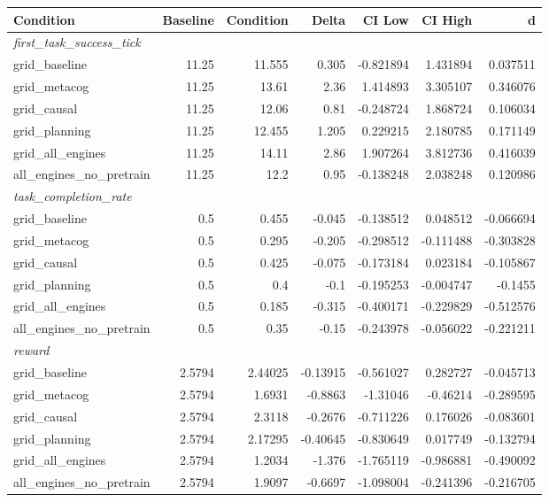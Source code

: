 \begin{tabular}{lrrrrrr}
\toprule
Condition & Baseline & Condition & Delta & CI Low & CI High & d \\
\midrule
  \multicolumn{7}{l}{\textit{first_task_success_tick}} \\
  grid_baseline & 11.25 & 11.555 & 0.305 & -0.821894 & 1.431894 & 0.037511 \\
  grid_metacog & 11.25 & 13.61 & 2.36 & 1.414893 & 3.305107 & 0.346076 \\
  grid_causal & 11.25 & 12.06 & 0.81 & -0.248724 & 1.868724 & 0.106034 \\
  grid_planning & 11.25 & 12.455 & 1.205 & 0.229215 & 2.180785 & 0.171149 \\
  grid_all_engines & 11.25 & 14.11 & 2.86 & 1.907264 & 3.812736 & 0.416039 \\
  all_engines_no_pretrain & 11.25 & 12.2 & 0.95 & -0.138248 & 2.038248 & 0.120986 \\
  \multicolumn{7}{l}{\textit{task_completion_rate}} \\
  grid_baseline & 0.5 & 0.455 & -0.045 & -0.138512 & 0.048512 & -0.066694 \\
  grid_metacog & 0.5 & 0.295 & -0.205 & -0.298512 & -0.111488 & -0.303828 \\
  grid_causal & 0.5 & 0.425 & -0.075 & -0.173184 & 0.023184 & -0.105867 \\
  grid_planning & 0.5 & 0.4 & -0.1 & -0.195253 & -0.004747 & -0.1455 \\
  grid_all_engines & 0.5 & 0.185 & -0.315 & -0.400171 & -0.229829 & -0.512576 \\
  all_engines_no_pretrain & 0.5 & 0.35 & -0.15 & -0.243978 & -0.056022 & -0.221211 \\
  \multicolumn{7}{l}{\textit{reward}} \\
  grid_baseline & 2.5794 & 2.44025 & -0.13915 & -0.561027 & 0.282727 & -0.045713 \\
  grid_metacog & 2.5794 & 1.6931 & -0.8863 & -1.31046 & -0.46214 & -0.289595 \\
  grid_causal & 2.5794 & 2.3118 & -0.2676 & -0.711226 & 0.176026 & -0.083601 \\
  grid_planning & 2.5794 & 2.17295 & -0.40645 & -0.830649 & 0.017749 & -0.132794 \\
  grid_all_engines & 2.5794 & 1.2034 & -1.376 & -1.765119 & -0.986881 & -0.490092 \\
  all_engines_no_pretrain & 2.5794 & 1.9097 & -0.6697 & -1.098004 & -0.241396 & -0.216705 \\

\end{tabular}
